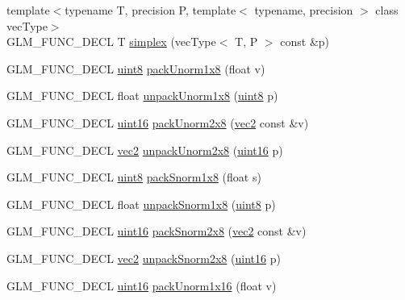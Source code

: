 \begin{CompactItemize}
\item 
{\footnotesize template$<$typename T, precision P, template$<$ typename, precision $>$ class vecType$>$ }\\GLM\_\-FUNC\_\-DECL T \hyperlink{group__gtc__noise_g2c46feb8914501452e6bcdc04f33a0b2}{simplex} (vecType$<$ T, P $>$ const \&p)
\item 
GLM\_\-FUNC\_\-DECL \hyperlink{group__gtc__type__precision_g1a7dcd8aac97cc8020817c94049deff2}{uint8} \hyperlink{group__gtc__packing_g2f9963e5d762b10085b280d3662017ba}{packUnorm1x8} (float v)
\item 
GLM\_\-FUNC\_\-DECL float \hyperlink{group__gtc__packing_g32f3f2642df2ea87449d59fb614a8305}{unpackUnorm1x8} (\hyperlink{group__gtc__type__precision_g1a7dcd8aac97cc8020817c94049deff2}{uint8} p)
\item 
GLM\_\-FUNC\_\-DECL \hyperlink{group__gtc__type__precision_gd8c2939e1fdd8e5828b31d95c52255d5}{uint16} \hyperlink{group__gtc__packing_g833288fc0d4a79f19d0db75a6843bfe6}{packUnorm2x8} (\hyperlink{group__core__types_ga1618f51db67eaa145db101d8c8431d8}{vec2} const \&v)
\item 
GLM\_\-FUNC\_\-DECL \hyperlink{group__core__types_ga1618f51db67eaa145db101d8c8431d8}{vec2} \hyperlink{group__gtc__packing_g96ce0c24339ee676e28a027fffd1edf6}{unpackUnorm2x8} (\hyperlink{group__gtc__type__precision_gd8c2939e1fdd8e5828b31d95c52255d5}{uint16} p)
\item 
GLM\_\-FUNC\_\-DECL \hyperlink{group__gtc__type__precision_g1a7dcd8aac97cc8020817c94049deff2}{uint8} \hyperlink{group__gtc__packing_g26b6cd7a35c46c4b6a342f3b97b47423}{packSnorm1x8} (float s)
\item 
GLM\_\-FUNC\_\-DECL float \hyperlink{group__gtc__packing_g6f2bebf536fbf7c8b97d4b306bb3354e}{unpackSnorm1x8} (\hyperlink{group__gtc__type__precision_g1a7dcd8aac97cc8020817c94049deff2}{uint8} p)
\item 
GLM\_\-FUNC\_\-DECL \hyperlink{group__gtc__type__precision_gd8c2939e1fdd8e5828b31d95c52255d5}{uint16} \hyperlink{group__gtc__packing_g05d08a82923166ec7cd5d0e6154c9953}{packSnorm2x8} (\hyperlink{group__core__types_ga1618f51db67eaa145db101d8c8431d8}{vec2} const \&v)
\item 
GLM\_\-FUNC\_\-DECL \hyperlink{group__core__types_ga1618f51db67eaa145db101d8c8431d8}{vec2} \hyperlink{group__gtc__packing_g27f30f0281b88e152b0895f5e2ead878}{unpackSnorm2x8} (\hyperlink{group__gtc__type__precision_gd8c2939e1fdd8e5828b31d95c52255d5}{uint16} p)
\item 
GLM\_\-FUNC\_\-DECL \hyperlink{group__gtc__type__precision_gd8c2939e1fdd8e5828b31d95c52255d5}{uint16} \hyperlink{group__gtc__packing_g60c7d915f5653559ae02c2f79a8c5c1d}{packUnorm1x16} (float v)

\end{CompactItemize}
